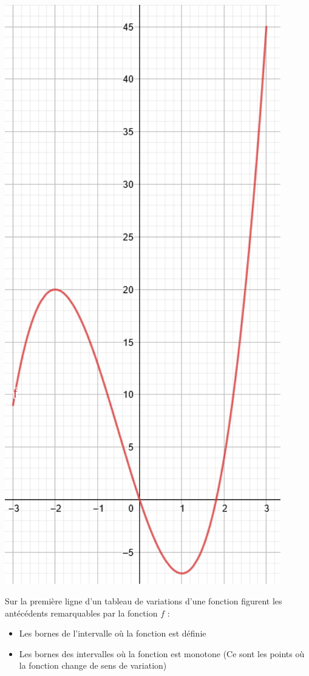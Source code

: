 \documentclass[10pt,a4paper,oneside]{book}
\begin{document}
\begin{minipage}{0.25\textwidth}
    \centering
    \includegraphics[width=0.9\textwidth]{20221101_CourbeRepTabloVariation.PNG} 
\end{minipage}

Sur la première ligne d'un tableau de variations d'une fonction figurent les antécédents remarquables par la fonction $f$ :\begin{itemize}
    \item Les bornes de l'intervalle où la fonction est définie
    \item Les bornes des intervalles où la fonction est monotone (Ce sont les points où la fonction change de sens de variation)
\end{itemize}
\end{document}
